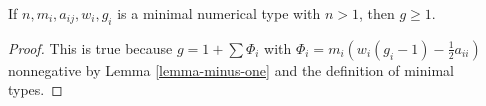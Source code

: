 \begin{lemma}
\label{lemma-non-irreducible-minimal-type-genus-at-least-one}
If $n, m_i, a_{ij}, w_i, g_i$ is a minimal numerical type
with $n > 1$, then $g \geq 1$.
\end{lemma}

\begin{proof}
This is true because $g = 1 + \sum \Phi_i$ with
$\Phi_i = m_i(w_i(g_i - 1) - \frac{1}{2} a_{ii})$ nonnegative
by Lemma \ref{lemma-minus-one} and the definition of minimal types.
\end{proof}
